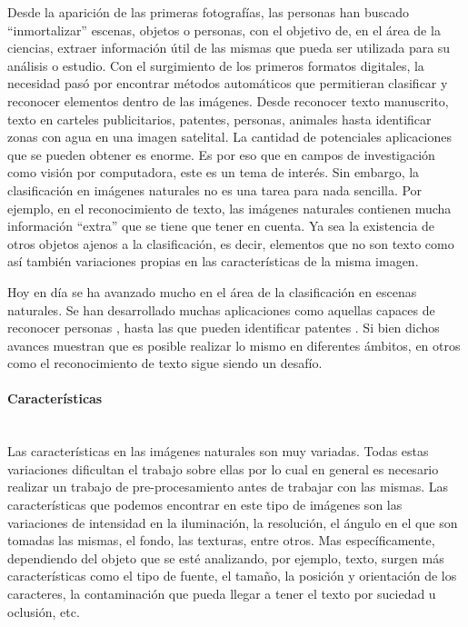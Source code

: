 	Desde la aparición de las primeras fotografías, las personas han buscado ``inmortalizar'' escenas, objetos o personas, con el objetivo de, en el área de la ciencias, extraer información útil de las mismas que pueda ser utilizada para su análisis o estudio. Con el surgimiento de los primeros formatos digitales, la necesidad pasó por encontrar métodos automáticos que permitieran clasificar y reconocer elementos dentro de las imágenes. Desde reconocer texto manuscrito, texto en carteles publicitarios, patentes, personas, animales hasta identificar zonas con agua en una imagen satelital. La cantidad de potenciales aplicaciones que se pueden obtener es enorme. Es por eso que en campos de investigación como visión por computadora, este es un tema de interés. Sin embargo, la clasificación en imágenes naturales no es una tarea para nada sencilla. Por ejemplo, en el reconocimiento de texto, las imágenes naturales contienen mucha información ``extra'' que se tiene que tener en cuenta. Ya sea la existencia de otros objetos ajenos a la clasificación, es decir, elementos que no son texto como así también variaciones propias en las características de la misma imagen.
	
	Hoy en día se ha avanzado mucho en el área de la clasificación en escenas naturales. Se han desarrollado muchas aplicaciones como aquellas capaces de reconocer personas \cite{DT05}, hasta las que pueden identificar patentes \cite{DAB}. Si bien dichos avances muestran que es posible realizar lo mismo en diferentes ámbitos, en otros como el reconocimiento de texto sigue siendo un desafío.
	
	
\paragraph{Características} ~\\
	
	Las características en las imágenes naturales son muy variadas. Todas estas variaciones dificultan el trabajo sobre ellas por lo cual en general es necesario realizar un trabajo de pre-procesamiento antes de trabajar con las mismas. Las características que podemos encontrar en este tipo de imágenes son las variaciones de intensidad en la iluminación, la resolución, el ángulo en el que son tomadas las mismas, el fondo, las texturas, entre otros. Mas específicamente, dependiendo del objeto que se esté analizando, por ejemplo, texto, surgen más características como el tipo de fuente, el tamaño, la posición y orientación de los caracteres, la contaminación que pueda llegar a tener el texto por suciedad u oclusión, etc.
	
